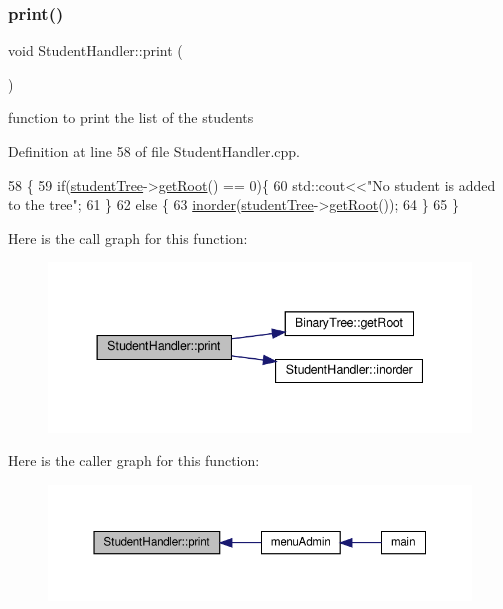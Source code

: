 \subsubsection{\texorpdfstring{print()}{print()}}
{\footnotesize\ttfamily void Student\+Handler\+::print (\begin{DoxyParamCaption}{ }\end{DoxyParamCaption})}

function to print the list of the students 

Definition at line 58 of file Student\+Handler.\+cpp.


\begin{DoxyCode}
58                            \{
59     \textcolor{keywordflow}{if}(\hyperlink{class_student_handler_a7141eccd57a30aa140e5b4e92b0939ea}{studentTree}->\hyperlink{class_binary_tree_a9ee0cf09781cf2ecc471aacc61848dde}{getRoot}() == 0)\{
60         std::cout<<\textcolor{stringliteral}{"No student is added to the tree"};
61     \}
62     \textcolor{keywordflow}{else} \{
63          \hyperlink{class_student_handler_a9caee269c1ef9b34af2eeb0452a0cabb}{inorder}(\hyperlink{class_student_handler_a7141eccd57a30aa140e5b4e92b0939ea}{studentTree}->\hyperlink{class_binary_tree_a9ee0cf09781cf2ecc471aacc61848dde}{getRoot}());
64     \}
65 \}
\end{DoxyCode}
Here is the call graph for this function\+:
\nopagebreak
\begin{figure}[H]
\begin{center}
\leavevmode
\includegraphics[width=344pt]{class_student_handler_a08899a7b8ca38541605c564c572d72ef_cgraph}
\end{center}
\end{figure}
Here is the caller graph for this function\+:
\nopagebreak
\begin{figure}[H]
\begin{center}
\leavevmode
\includegraphics[width=350pt]{class_student_handler_a08899a7b8ca38541605c564c572d72ef_icgraph}
\end{center}
\end{figure}
\mbox{\label{class_student_handler_a8049bb821d2a0a951600ab79c6ee4e27}} 
